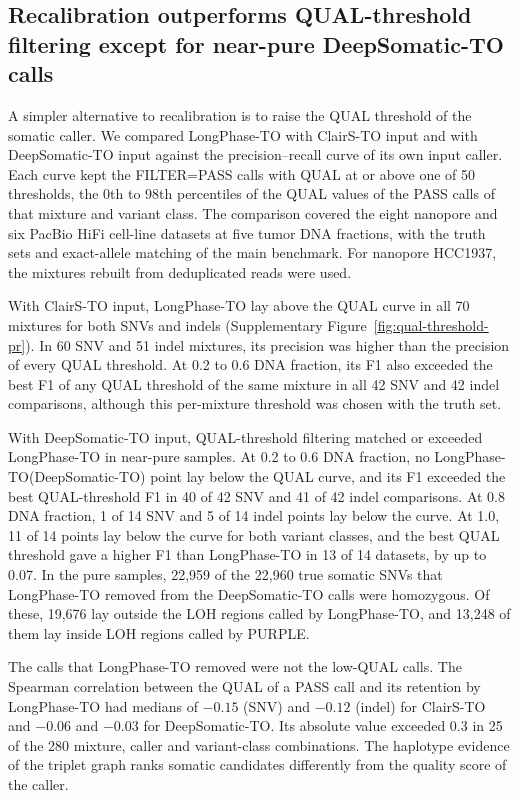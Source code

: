 \documentclass[pdflatex,sn-nature]{sn-jnl}
\begin{document}
\subsection{Recalibration outperforms QUAL-threshold filtering except for near-pure DeepSomatic-TO calls}\label{supp:qual-threshold}

A simpler alternative to recalibration is to raise the QUAL threshold of the somatic caller. We compared LongPhase-TO with ClairS-TO input and with DeepSomatic-TO input against the precision--recall curve of its own input caller. Each curve kept the FILTER=PASS calls with QUAL at or above one of 50 thresholds, the 0th to 98th percentiles of the QUAL values of the PASS calls of that mixture and variant class. The comparison covered the eight nanopore and six PacBio HiFi cell-line datasets at five tumor DNA fractions, with the truth sets and exact-allele matching of the main benchmark. For nanopore HCC1937, the mixtures rebuilt from deduplicated reads were used.

With ClairS-TO input, LongPhase-TO lay above the QUAL curve in all 70 mixtures for both SNVs and indels (Supplementary Figure~\ref{fig:qual-threshold-pr}). In 60 SNV and 51 indel mixtures, its precision was higher than the precision of every QUAL threshold. At 0.2 to 0.6 DNA fraction, its F1 also exceeded the best F1 of any QUAL threshold of the same mixture in all 42 SNV and 42 indel comparisons, although this per-mixture threshold was chosen with the truth set.

With DeepSomatic-TO input, QUAL-threshold filtering matched or exceeded LongPhase-TO in near-pure samples. At 0.2 to 0.6 DNA fraction, no LongPhase-TO(DeepSomatic-TO) point lay below the QUAL curve, and its F1 exceeded the best QUAL-threshold F1 in 40 of 42 SNV and 41 of 42 indel comparisons. At 0.8 DNA fraction, 1 of 14 SNV and 5 of 14 indel points lay below the curve. At 1.0, 11 of 14 points lay below the curve for both variant classes, and the best QUAL threshold gave a higher F1 than LongPhase-TO in 13 of 14 datasets, by up to 0.07. In the pure samples, 22,959 of the 22,960 true somatic SNVs that LongPhase-TO removed from the DeepSomatic-TO calls were homozygous. Of these, 19,676 lay outside the LOH regions called by LongPhase-TO, and 13,248 of them lay inside LOH regions called by PURPLE.

The calls that LongPhase-TO removed were not the low-QUAL calls. The Spearman correlation between the QUAL of a PASS call and its retention by LongPhase-TO had medians of $-0.15$ (SNV) and $-0.12$ (indel) for ClairS-TO and $-0.06$ and $-0.03$ for DeepSomatic-TO. Its absolute value exceeded 0.3 in 25 of the 280 mixture, caller and variant-class combinations. The haplotype evidence of the triplet graph ranks somatic candidates differently from the quality score of the caller.
\end{document}
